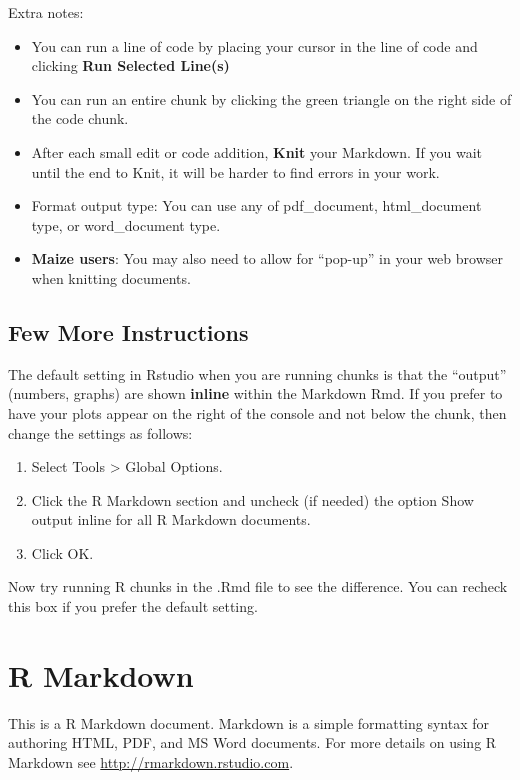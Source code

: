 \documentclass[
]{book}
\providecommand{\tightlist}{%
  \setlength{\itemsep}{0pt}\setlength{\parskip}{0pt}}
\begin{document}
Extra notes:

\begin{itemize}
\item
  You can run a line of code by placing your cursor in the line of code and clicking \textbf{Run Selected Line(s)}
\item
  You can run an entire chunk by clicking the green triangle on the right side of the code chunk.
\item
  After each small edit or code addition, \textbf{Knit} your Markdown. If you wait until the end to Knit, it will be harder to find errors in your work.
\item
  Format output type: You can use any of pdf\_document, html\_document type, or word\_document type.
\item
  \textbf{Maize users}: You may also need to allow for ``pop-up'' in your web browser when knitting documents.
\end{itemize}

\hypertarget{few-more-instructions}{%
\section{Few More Instructions}\label{few-more-instructions}}

The default setting in Rstudio when you are running chunks is that the ``output'' (numbers, graphs) are
shown \textbf{inline} within the Markdown Rmd. If you prefer to have your plots appear on the right of the console and not below the chunk, then change the settings as follows:

\begin{enumerate}
\def\labelenumi{\arabic{enumi}.}
\tightlist
\item
  Select Tools \textgreater{} Global Options.
\item
  Click the R Markdown section and uncheck (if needed) the option Show output inline for all
  R Markdown documents.
\item
  Click OK.
\end{enumerate}

Now try running R chunks in the .Rmd file to see the difference. You can recheck this box if you prefer
the default setting.

\hypertarget{r-markdown}{%
\chapter{R Markdown}\label{r-markdown}}

This is a R Markdown document. Markdown is a simple formatting syntax for authoring HTML, PDF, and MS Word documents. For more details on using R Markdown see \url{http://rmarkdown.rstudio.com}.
\end{document}
